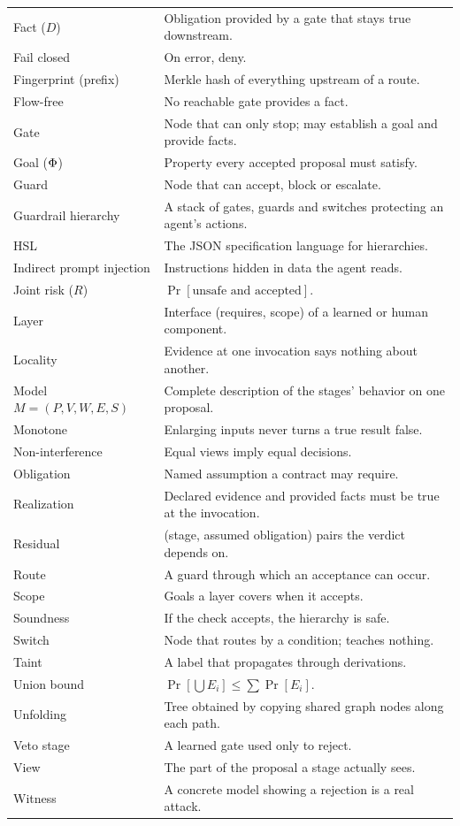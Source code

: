 \begin{center}
\begin{longtable}{@{}p{3.4cm}p{12.4cm}@{}}
Fact ($D$) & Obligation provided by a gate that stays true downstream.\\
Fail closed & On error, deny.\\
Fingerprint (prefix) & Merkle hash of everything upstream of a route.\\
Flow-free & No reachable gate provides a fact.\\
Gate & Node that can only stop; may establish a goal and provide facts.\\
Goal ($\Phi$) & Property every accepted proposal must satisfy.\\
Guard & Node that can accept, block or escalate.\\
Guardrail hierarchy & A stack of gates, guards and switches protecting an agent's actions.\\
HSL & The JSON specification language for hierarchies.\\
Indirect prompt injection & Instructions hidden in data the agent reads.\\
Joint risk ($R$) & $\Pr[\text{unsafe and accepted}]$.\\
Layer & Interface (requires, scope) of a learned or human component.\\
Locality & Evidence at one invocation says nothing about another.\\
Model $M=(P,V,W,E,S)$ & Complete description of the stages' behavior on one proposal.\\
Monotone & Enlarging inputs never turns a true result false.\\
Non-interference & Equal views imply equal decisions.\\
Obligation & Named assumption a contract may require.\\
Realization & Declared evidence and provided facts must be true at the invocation.\\
Residual & (stage, assumed obligation) pairs the verdict depends on.\\
Route & A guard through which an acceptance can occur.\\
Scope & Goals a layer covers when it accepts.\\
Soundness & If the check accepts, the hierarchy is safe.\\
Switch & Node that routes by a condition; teaches nothing.\\
Taint & A label that propagates through derivations.\\
Union bound & $\Pr[\bigcup E_i]\le\sum\Pr[E_i]$.\\
Unfolding & Tree obtained by copying shared graph nodes along each path.\\
Veto stage & A learned gate used only to reject.\\
View & The part of the proposal a stage actually sees.\\
Witness & A concrete model showing a rejection is a real attack.\\
\bottomrule
\end{longtable}
\end{center}


